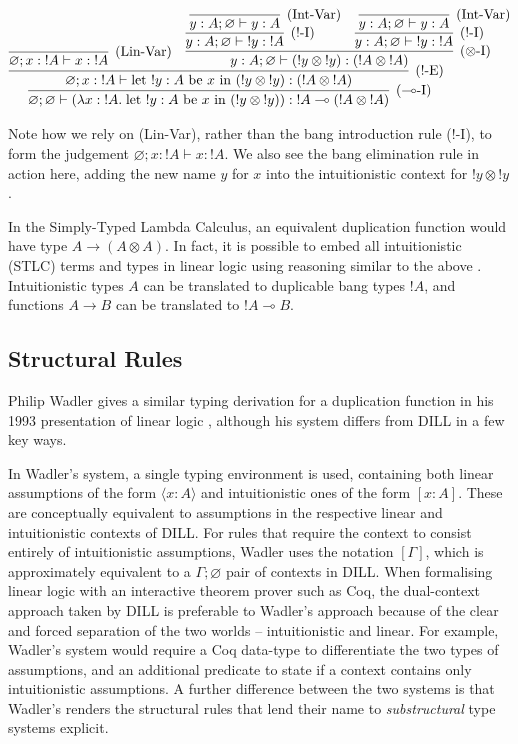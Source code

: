 \documentclass[]{unswthesis}
\let\emptyset\varnothing
\newcommand{\lolly}{\multimap}
\newcommand{\types}{\vdash}
\let\i\textit
\let\t\text
\begin{document}
\begin{eqnarray*}
\infer[\t{($\lolly$-I)}]{\emptyset; \emptyset \types (\lambda x : {!A}. \; \t{let } {!y} : A \t{ be } x \t{ in } ({!y} \otimes {!y})) : {!A} \lolly ({!A} \otimes {!A})}{
  \infer[\t{(!-E)}]{\emptyset; x : {!A} \types \t{let } {!y} : A \t{ be } x \t{ in } ({!y} \otimes {!y}) : ({!A} \otimes {!A})}{
    \infer[\t{(Lin-Var)}]{
      \emptyset; x : {!A} \types x : {!A}
    }{} &
    \infer[\t{($\otimes$-I)}]{
      y : A; \emptyset \types ({!y} \otimes {!y}) : ({!A} \otimes {!A})
    }{
      \infer[\t{(!-I)}]{y : A; \emptyset \types {!y} : {!A}}{
        \infer[\t{(Int-Var)}]{y : A; \emptyset \types y : A}{}
      } &
      \infer[\t{(!-I)}]{y : A; \emptyset \types {!y} : {!A}}{
        \infer[\t{(Int-Var)}]{y : A; \emptyset \types y : A}{}
      }
    }
  }
}
\end{eqnarray*}

Note how we rely on (Lin-Var), rather than the bang introduction rule (!-I), to form the judgement $\emptyset; x : {!A} \types x : {!A}$. We also see the bang elimination rule in action here, adding the new name $y$ for $x$ into the intuitionistic context for ${!y} \otimes {!y}$.

In the Simply-Typed Lambda Calculus, an equivalent duplication function would have type $A \to (A \otimes A)$. In fact, it is possible to embed all intuitionistic (STLC) terms and types in linear logic using reasoning similar to the above \cite{barber96}. Intuitionistic types $A$ can be translated to duplicable bang types ${!A}$, and functions $A \to B$ can be translated to ${!A} \lolly B$.

\subsection{Structural Rules}

Philip Wadler gives a similar typing derivation for a duplication function in his 1993 presentation of linear logic \cite{wadler93}, although his system differs from DILL in a few key ways.

In Wadler's system, a single typing environment is used, containing both linear assumptions of the form $\langle x : A \rangle$ and intuitionistic ones of the form $[x : A]$. These are conceptually equivalent to assumptions in the respective linear and intuitionistic contexts of DILL. For rules that require the context to consist entirely of intuitionistic assumptions, Wadler uses the notation $[\Gamma]$, which is approximately equivalent to a $\Gamma; \emptyset$ pair of contexts in DILL. When formalising linear logic with an interactive theorem prover such as Coq, the dual-context approach taken by DILL is preferable to Wadler's approach because of the clear and forced separation of the two worlds -- intuitionistic and linear. For example, Wadler's system would require a Coq data-type to differentiate the two types of assumptions, and an additional predicate to state if a context contains only intuitionistic assumptions. A further difference between the two systems is that Wadler's renders the structural rules that lend their name to \i{substructural} type systems explicit.
\end{document}
